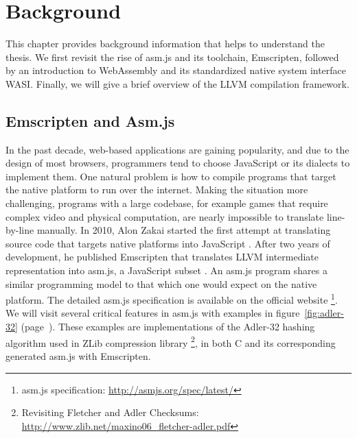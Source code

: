 \chapter{Background}

This chapter provides background information that helps to understand the
thesis. We first revisit the rise of asm.js and its toolchain, Emscripten,
followed by an introduction to WebAssembly and its standardized native system
interface WASI. Finally, we will give a brief overview of the LLVM compilation
framework.

\section{Emscripten and Asm.js}

In the past decade, web-based applications are gaining popularity, and due to
the design of most browsers, programmers tend to choose JavaScript or its
dialects to implement them. One natural problem is how to compile programs that
target the native platform to run over the internet. Making the situation more
challenging, programs with a large codebase, for example games that require
complex video and physical computation, are nearly impossible to translate
line-by-line manually. In 2010, Alon Zakai started the first attempt at
translating source code that targets native platforms into JavaScript
\cite{8118483}. After two years of development, he published Emscripten that
translates LLVM intermediate representation into asm.js, a JavaScript subset
\cite{10.1145/2048147.2048224}. An asm.js program shares a similar programming
model to that which one would expect on the native platform. The detailed asm.js
specification is available on the official website
\footnote{asm.js specification: \url{http://asmjs.org/spec/latest/}}.
We will visit several critical features in asm.js with examples in
figure~\ref{fig:adler-32} (page~\pageref{fig:adler-32}). These examples are
implementations of the Adler-32 hashing algorithm used in ZLib compression
library \cite{adler32-paper} \footnote{Revisiting Fletcher and Adler Checksums:
  \\\url{http://www.zlib.net/maxino06\_fletcher-adler.pdf}}, in both C and its
corresponding generated asm.js with Emscripten.

